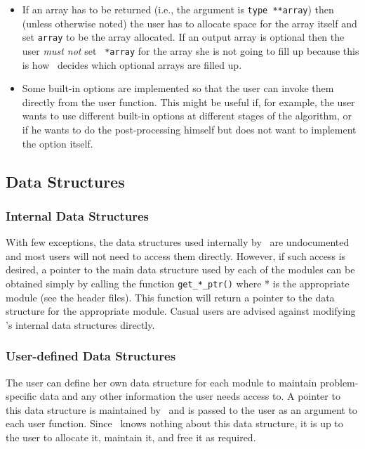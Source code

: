 \begin{description}
\begin{itemize}
\item If an array has to be returned (i.e., the argument is {\tt type
**array}) then (unless otherwise noted) the user has to allocate space
for the array itself and set {\tt *array} to be the array allocated.
If an output array is optional then the user {\em must not} set {\tt
*array} for the array she is not going to fill up because this is how
\BB\ decides which optional arrays are filled up.

\item Some built-in options are implemented so that the user can invoke them
directly from the user function. This might be useful if, for example,
the user wants to use different built-in options at different stages
of the algorithm, or if he wants to do the post-processing himself but
does not want to implement the option itself.
\end{itemize}

\end{description}

\subsection{Data Structures}

\subsubsection{Internal Data Structures}

With few exceptions, the data structures used internally by \BB\
are undocumented and most users will not need to access them
directly. However, if such access is desired, a pointer to the main data
structure used by each of the modules can be obtained simply by calling
the function {\tt get\_*\_ptr()} where * is the appropriate module (see the
header files). This function will return a pointer to the data
structure for the appropriate module. Casual users are advised against
modifying \BB's internal data structures directly.

\subsubsection{User-defined Data Structures}

The user can define her own data structure for each module to maintain
problem-specific data and any other information the user needs access
to. A pointer to this data structure is maintained by \BB\ and is
passed to the user as an argument to each user function. Since
\BB\ knows nothing about this data structure, it is up to the user
to allocate it, maintain it, and free it as required.

